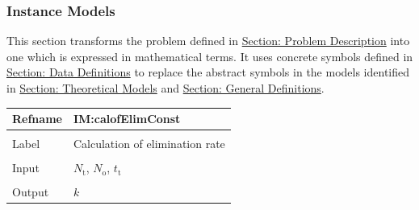 \documentclass[12pt]{article}
\begin{document}
\subsubsection{Instance Models}
\label{Sec:IMs}
This section transforms the problem defined in \hyperref[Sec:ProbDesc]{Section: Problem Description} into one which is expressed in mathematical terms. It uses concrete symbols defined in \hyperref[Sec:DDs]{Section: Data Definitions} to replace the abstract symbols in the models identified in \hyperref[Sec:TMs]{Section: Theoretical Models} and \hyperref[Sec:GDs]{Section: General Definitions}.

\vspace{\baselineskip}
\noindent
\begin{minipage}{\textwidth}
\begin{tabular}{>{\raggedright}p{}>{\raggedright\arraybackslash}p{}}
\toprule \textbf{Refname} & \textbf{IM:calofElimConst}
\label{IM:calofElimConst}
\\ \midrule \\
Label & Calculation of elimination rate
        
\\ \midrule \\
Input & ${N_{\text{t}}}$, ${N_{\text{o}}}$, ${t_{\text{t}}}$
        
\\ \midrule \\
Output & $k$
         

\end{tabular}
\end{minipage}
\end{document}
